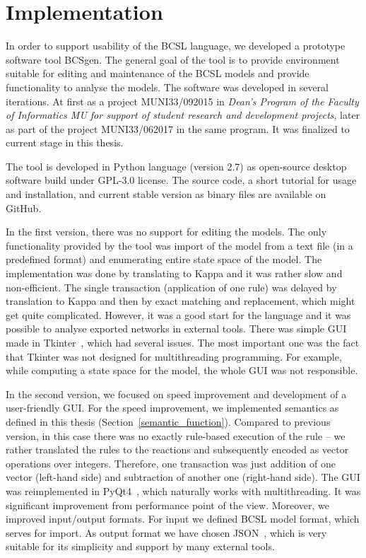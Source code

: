 \documentclass[12pt]{fithesis2}
\begin{document}
\chapter{Implementation}
\label{implementation}

In order to support usability of the BCSL language, we developed a prototype software tool BCSgen. The general goal of the tool is to provide environment suitable for editing and maintenance of the BCSL models and provide functionality to analyse the models. The software was developed in several iterations. At first as a project MUNI33/092015 in \emph{Dean's Program of the Faculty of Informatics MU for support of student research and development projects}, later as part of the project MUNI33/062017 in the same program. It was finalized to current stage in this thesis.

The tool is developed in Python language (version 2.7) as open-source desktop software build under GPL-3.0 license. The source code, a short tutorial for usage and installation, and current stable version as binary files are available on GitHub\footnotemark[1].

In the first version, there was no support for editing the models. The only functionality provided by the tool was import of the model from a text file (in a predefined format) and enumerating entire state space of the model. The implementation was done by translating to Kappa and it was rather slow and non-efficient. The single transaction (application of one rule) was delayed by translation to Kappa and then by exact matching and replacement, which might get quite complicated. However, it was a good start for the language and it was possible to analyse exported networks in external tools. There was simple GUI made in Tkinter~\cite{Tkinter}, which had several issues. The most important one was the fact that Tkinter was not designed for multithreading programming. For example, while computing a state space for the model, the whole GUI was not responsible.

In the second version, we focused on speed improvement and development of a user-friendly GUI. For the speed improvement, we implemented semantics as defined in this thesis (Section~\ref{semantic_function}). Compared to previous version, in this case there was no exactly rule-based execution of the rule -- we rather translated the rules to the reactions and subsequently encoded as vector operations over integers. Therefore, one transaction was just addition of one vector (left-hand side) and subtraction of another one (right-hand side). The GUI was reimplemented in PyQt4~\cite{summerfield2007rapid}, which naturally works with multithreading. It was significant improvement from performance point of the view. Moreover, we improved input/output formats. For input we defined BCSL model format, which serves for import. As output format we have chosen JSON~\cite{json}, which is very suitable for its simplicity and support by many external tools.
\end{document}
